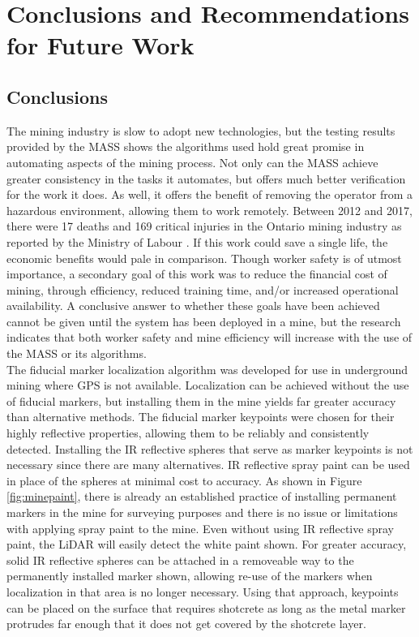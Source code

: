 \chapter{Conclusions and Recommendations for Future Work}
\label{chap:conclusions}
\section{Conclusions}
The mining industry is slow to adopt new technologies, but the testing results provided by the MASS shows the algorithms used hold great promise in automating aspects of the mining process. Not only can the MASS achieve greater consistency in the tasks it automates, but offers much better verification for the work it does. As well, it offers the benefit of removing the operator from a hazardous environment, allowing them to work remotely. Between 2012 and 2017, there were 17 deaths and 169 critical injuries in the Ontario mining industry as reported by the Ministry of Labour \cite{seebelow}. If this work could save a single life, the economic benefits would pale in comparison. Though worker safety is of utmost importance, a secondary goal of this work was to reduce the financial cost of mining, through efficiency, reduced training time, and/or increased operational availability. A conclusive answer to whether these goals have been achieved cannot be given until the system has been deployed in a mine, but the research indicates that both worker safety and mine efficiency will increase with the use of the MASS or its algorithms.\\

The fiducial marker localization algorithm was developed for use in underground mining where GPS is not available. Localization can be achieved without the use of fiducial markers, but installing them in the mine yields far greater accuracy than alternative methods. The fiducial marker keypoints were chosen for their highly reflective properties, allowing them to be reliably and consistently detected. Installing the IR reflective spheres that serve as marker keypoints is not necessary since there are many alternatives. IR reflective spray paint can be used in place of the spheres at minimal cost to accuracy. As shown in Figure \ref{fig:minepaint}, there is already an established practice of installing permanent markers in the mine for surveying purposes and there is no issue or limitations with applying spray paint to the mine. Even without using IR reflective spray paint, the LiDAR will easily detect the white paint shown. For greater accuracy, solid IR reflective spheres can be attached in a removeable way to the permanently installed marker shown, allowing re-use of the markers when localization in that area is no longer necessary. Using that approach, keypoints can be placed on the surface that requires shotcrete as long as the metal marker protrudes far enough that it does not get covered by the shotcrete layer.\\

